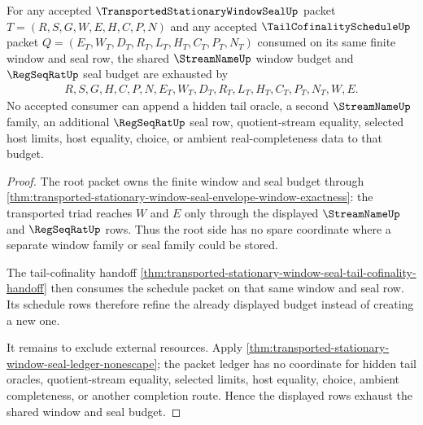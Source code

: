 \begin{theorem}
\label{thm:transported-stationary-window-seal-shared-window-budget-exhaustion}
For any accepted $\TransportedStationaryWindowSealUp$ packet $T=(R,S,G,W,E,H,C,P,N)$ and any accepted $\TailCofinalityScheduleUp$ packet $Q=(E_T,W_T,D_T,R_T,L_T,H_T,C_T,P_T,N_T)$ consumed on its same finite window and seal row, the shared $\StreamNameUp$ window budget and $\RegSeqRatUp$ seal budget are exhausted by
$$
\begin{aligned}
  R,S,G,H,C,P,N,
  E_T,W_T,D_T,R_T,L_T,H_T,C_T,P_T,N_T,
  W,E .
\end{aligned}
$$
No accepted consumer can append a hidden tail oracle, a second $\StreamNameUp$ family, an additional $\RegSeqRatUp$ seal row, quotient-stream equality, selected host limits, host equality, choice, or ambient real-completeness data to that budget.
\end{theorem}
\begin{proof}
The root packet owns the finite window and seal budget through \autoref{thm:transported-stationary-window-seal-envelope-window-exactness}: the transported triad reaches $W$ and $E$ only through the displayed $\StreamNameUp$ and $\RegSeqRatUp$ rows. Thus the root side has no spare coordinate where a separate window family or seal family could be stored.

The tail-cofinality handoff \autoref{thm:transported-stationary-window-seal-tail-cofinality-handoff} then consumes the schedule packet on that same window and seal row. Its schedule rows therefore refine the already displayed budget instead of creating a new one.

It remains to exclude external resources. Apply \autoref{thm:transported-stationary-window-seal-ledger-nonescape}; the packet ledger has no coordinate for hidden tail oracles, quotient-stream equality, selected limits, host equality, choice, ambient completeness, or another completion route. Hence the displayed rows exhaust the shared window and seal budget.
\end{proof}

